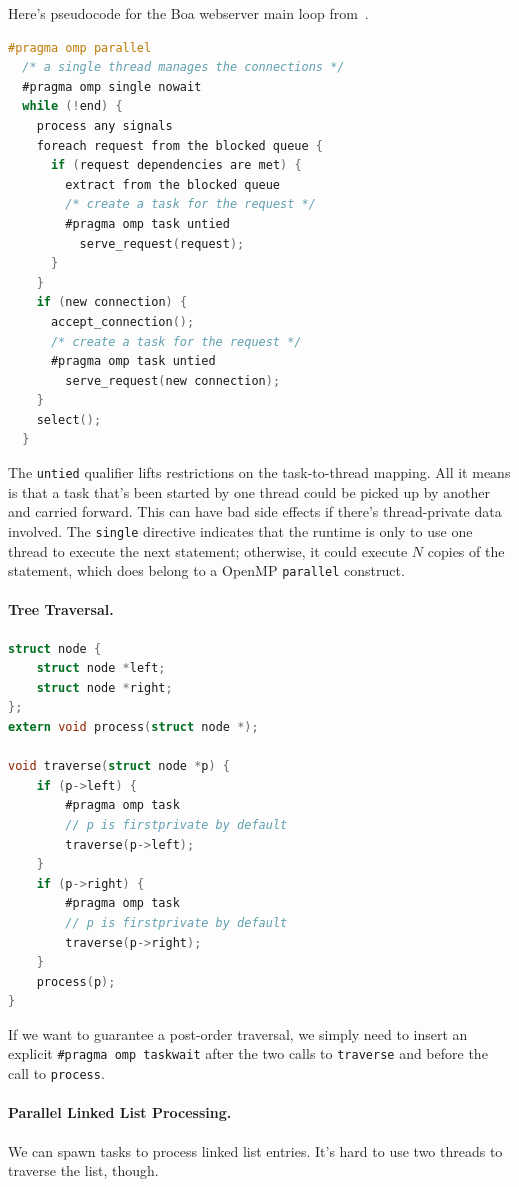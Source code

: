 \documentclass[a4paper]{report}
\begin{document}
Here's pseudocode for the Boa webserver main loop from~\cite{Ayguade:2009:DOT:1512157.1512430}.
{\small
\begin{lstlisting}[language=C,morekeywords={foreach,pragma,omp,parallel,single,nowait,task,untied,barrier,taskyield}]
#pragma omp parallel
  /* a single thread manages the connections */
  #pragma omp single nowait
  while (!end) {
    process any signals
    foreach request from the blocked queue {
      if (request dependencies are met) {
        extract from the blocked queue
        /* create a task for the request */
        #pragma omp task untied
          serve_request(request);
      }
    }
    if (new connection) {
      accept_connection();
      /* create a task for the request */
      #pragma omp task untied
        serve_request(new connection);
    }
    select();
  }
\end{lstlisting}
}
The {\tt untied} qualifier lifts restrictions on the task-to-thread mapping.
All it means is that a task that's been started by one thread could be picked up
by another and carried forward. This can have bad side effects if there's
thread-private data involved. The {\tt single} directive indicates that the
runtime is only to use one thread to execute the next statement; otherwise,
it could execute $N$ copies of the statement, which does belong to a
OpenMP {\tt parallel} construct.

\paragraph{Tree Traversal.}
  \begin{lstlisting}[language=C]
struct node {
    struct node *left;
    struct node *right;
};
extern void process(struct node *);

void traverse(struct node *p) {
    if (p->left) {
        #pragma omp task
        // p is firstprivate by default
        traverse(p->left);
    }
    if (p->right) {
        #pragma omp task
        // p is firstprivate by default
        traverse(p->right);
    }
    process(p);
}    
  \end{lstlisting}

If we want to guarantee a post-order traversal,
we simply need to insert an explicit \verb+#pragma omp taskwait+
after the two calls to {\tt traverse} and before the
call to {\tt process}.


\paragraph{Parallel Linked List Processing.} We can spawn 
tasks to process linked list entries. It's hard to
use two threads to traverse the list, though.
\end{document}

